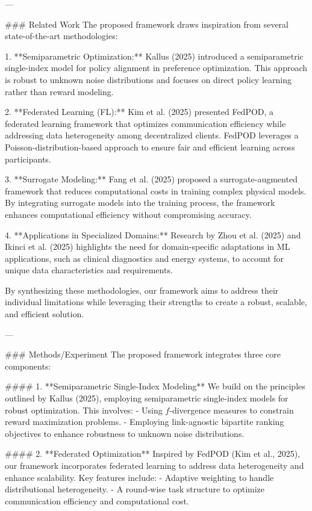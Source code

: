 ---

### Related Work
The proposed framework draws inspiration from several state-of-the-art methodologies:

1. **Semiparametric Optimization:** Kallus (2025) introduced a semiparametric single-index model for policy alignment in preference optimization. This approach is robust to unknown noise distributions and focuses on direct policy learning rather than reward modeling.

2. **Federated Learning (FL):** Kim et al. (2025) presented FedPOD, a federated learning framework that optimizes communication efficiency while addressing data heterogeneity among decentralized clients. FedPOD leverages a Poisson-distribution-based approach to ensure fair and efficient learning across participants.

3. **Surrogate Modeling:** Fang et al. (2025) proposed a surrogate-augmented framework that reduces computational costs in training complex physical models. By integrating surrogate models into the training process, the framework enhances computational efficiency without compromising accuracy.

4. **Applications in Specialized Domains:** Research by Zhou et al. (2025) and Ikinci et al. (2025) highlights the need for domain-specific adaptations in ML applications, such as clinical diagnostics and energy systems, to account for unique data characteristics and requirements.

By synthesizing these methodologies, our framework aims to address their individual limitations while leveraging their strengths to create a robust, scalable, and efficient solution.

---

### Methods/Experiment
The proposed framework integrates three core components:

#### 1. **Semiparametric Single-Index Modeling**
We build on the principles outlined by Kallus (2025), employing semiparametric single-index models for robust optimization. This involves:
- Using $f$-divergence measures to constrain reward maximization problems.
- Employing link-agnostic bipartite ranking objectives to enhance robustness to unknown noise distributions.

#### 2. **Federated Optimization**
Inspired by FedPOD (Kim et al., 2025), our framework incorporates federated learning to address data heterogeneity and enhance scalability. Key features include:
- Adaptive weighting to handle distributional heterogeneity.
- A round-wise task structure to optimize communication efficiency and computational cost.

